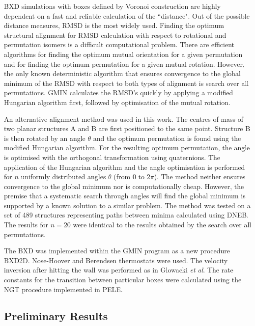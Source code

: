 BXD simulations with boxes defined by Voronoi construction are highly dependent on a fast and reliable calculation of the ``distance".
Out of the possible distance measures, RMSD is the most widely used.
Finding the optimum structural alignment for RMSD calculation with respect to rotational and permutation isomers is a difficult computational problem.
There are efficient algorithms for finding the optimum mutual orientation\cite{Kearsley1989} for a given permutation and for finding the optimum permutation \cite{Kuhn1955, Jonker1987} for a given mutual rotation.
However, the only known deterministic algorithm that ensures convergence to the global minimum of the RMSD with respect to both types of alignment is search over all permutations.
\mbox{GMIN\cite{GMIN}} calculates the RMSD's quickly by applying a modified Hungarian algorithm\cite{Jonker1987} first, followed by optimisation of the mutual rotation.

An alternative alignment method was used in this work.
The centres of mass of two planar structures A and B are first positioned to the same point.
Structure B is then rotated by an angle $\theta$ and the optimum permutation is found using the modified Hungarian algorithm.\cite{Jonker1987}
For the resulting optimum permutation, the angle is optimised with the orthogonal transformation using quaternions.\cite{Kearsley1989}
The application of the Hungarian algorithm and the angle optimisation is performed for $n$ uniformly distributed angles $\theta$ (from 0 to $2 \pi$).
The method neither ensures convergence to the global minimum nor is computationally cheap.
However, the premise that a systematic search through angles will find the global minimum is supported by a known solution to a similar problem.\cite{Helmich2012}
The method was tested on a set of 489 structures representing paths between minima calculated using DNEB.
The results for $n=20$ were identical to the results obtained by the search over all permutations.

The BXD was implemented within the GMIN program\cite{GMIN} as a new procedure BXD2D.
Nose-Hoover \cite{Nose1984, Kleinerman2008} and Berendsen \cite{Berendsen1984} thermostats were used.
The velocity inversion after hitting the wall was performed as in Glowacki {\it et al}.\cite{Glowacki2009}
The rate constants for the transition between particular boxes were calculated using the NGT procedure\cite{Wales2009} implemented in PELE.\cite{pele}

\subsection{Preliminary Results}

